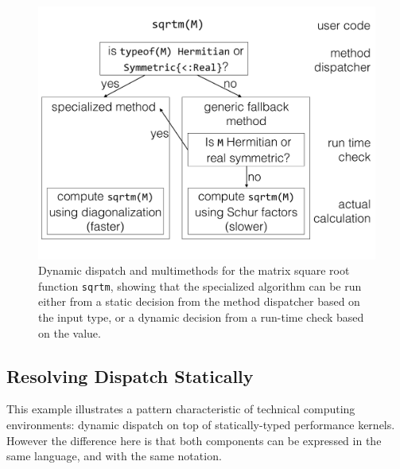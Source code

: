 \begin{figure}
	\centering
	\includegraphics[width=\columnwidth]{fig-sqrtm}
	\caption{Dynamic dispatch and multimethods for the matrix square root
		function \texttt{sqrtm}, showing that the specialized algorithm
		can be run either from a static decision from the method
		dispatcher based on the input type, or a dynamic decision from
		a run-time check based on the value.}
	\label{fig:sqrtm}
\end{figure}

\subsection{Resolving Dispatch Statically}
This example illustrates a pattern characteristic of technical
computing environments: dynamic dispatch on top of statically-typed
performance kernels.
However the difference here is that both components can be expressed
in the same language, and with the same notation.




